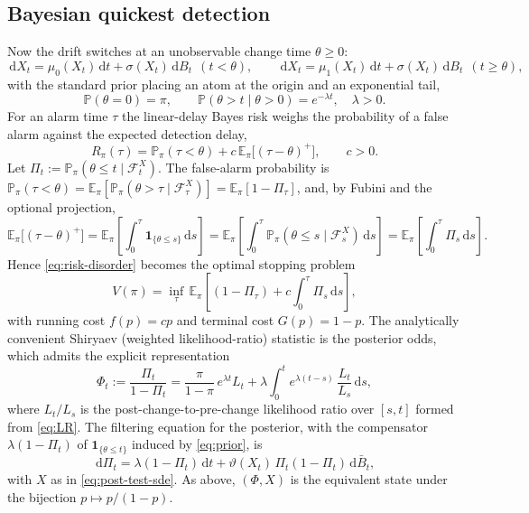 \documentclass[pdflatex,sn-mathphys-num]{sn-jnl}
\theoremstyle{plain}
\theoremstyle{definition}
\newcommand{\E}{\mathbb{E}}
\newcommand{\PR}{\mathbb{P}}
\newcommand{\Fx}{\mathcal{F}}
\newcommand{\ind}{\mathbf{1}}
\newcommand{\dd}{\,\mathrm{d}}
\newcommand{\snr}{\vartheta}
\newcommand{\post}{\Pi}
\newcommand{\odds}{\Phi}
\newcommand{\bbar}{\bar{B}}
\begin{document}
\subsection{Bayesian quickest detection}\label{sec:detect}
Now the drift switches at an unobservable change time $\theta\ge0$:
\begin{equation}\label{eq:disorder-dyn}
  \dd X_t=\mu_0(X_t)\dd t+\sigma(X_t)\dd B_t\ \ (t<\theta),\qquad
  \dd X_t=\mu_1(X_t)\dd t+\sigma(X_t)\dd B_t\ \ (t\ge\theta),
\end{equation}
with the standard prior placing an atom at the origin and an exponential tail,
\begin{equation}\label{eq:prior}
  \PR(\theta=0)=\pi,\qquad \PR(\theta>t\mid\theta>0)=e^{-\lambda t},\quad\lambda>0.
\end{equation}
For an alarm time $\tau$ the linear-delay Bayes risk weighs the probability of a
false alarm against the expected detection delay,
\begin{equation}\label{eq:risk-disorder}
  R_\pi(\tau)=\PR_\pi(\tau<\theta)+c\,\E_\pi\big[(\tau-\theta)^+\big],\qquad c>0.
\end{equation}
Let $\post_t:=\PR_\pi(\theta\le t\mid\Fx^X_t)$. The false-alarm probability is
$\PR_\pi(\tau<\theta)=\E_\pi[\PR_\pi(\theta>\tau\mid\Fx^X_\tau)]=\E_\pi[1-\post_\tau]$,
and, by Fubini and the optional projection,
\begin{equation}\label{eq:delay-id}
  \E_\pi\big[(\tau-\theta)^+\big]
  =\E_\pi\!\left[\int_0^\tau\ind_{\{\theta\le s\}}\dd s\right]
  =\E_\pi\!\left[\int_0^\tau\PR_\pi(\theta\le s\mid\Fx^X_s)\dd s\right]
  =\E_\pi\!\left[\int_0^\tau\post_s\dd s\right].
\end{equation}
Hence \eqref{eq:risk-disorder} becomes the optimal stopping problem
\begin{equation}\label{eq:value-disorder}
  V(\pi)=\inf_\tau\,\E_\pi\!\left[(1-\post_\tau)+c\int_0^\tau\post_s\dd s\right],
\end{equation}
with running cost $f(p)=cp$ and terminal cost $G(p)=1-p$. The analytically
convenient Shiryaev (weighted likelihood-ratio) statistic is the posterior odds,
which admits the explicit representation
\begin{equation}\label{eq:shiryaev-stat}
  \odds_t:=\frac{\post_t}{1-\post_t}
   =\frac{\pi}{1-\pi}\,e^{\lambda t}L_t
   +\lambda\int_0^t e^{\lambda(t-s)}\,\frac{L_t}{L_s}\dd s,
\end{equation}
where $L_t/L_s$ is the post-change-to-pre-change likelihood ratio over $[s,t]$
formed from \eqref{eq:LR}. 
The filtering equation for the posterior, with the
compensator $\lambda(1-\post_t)$ of $\ind_{\{\theta\le t\}}$ induced by
\eqref{eq:prior}, is
\begin{equation}\label{eq:post-disorder-sde}
  \dd\post_t=\lambda(1-\post_t)\dd t+\snr(X_t)\,\post_t(1-\post_t)\dd\bbar_t,
\end{equation}
with $X$ as in \eqref{eq:post-test-sde}. As above, $(\odds,X)$ is the equivalent
state under the bijection $p\mapsto p/(1-p)$.
\end{document}
